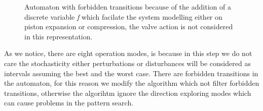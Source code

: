       \begin{figure}[!hbt]
        \centering
        
        \captionsetup{format=hang}
        \caption{Automaton with forbidden transitions because of the addition of a 
        discrete variable \emph{f} which facilate the system modelling either on
        piston expansion or compression, the valve action is not considered
        in this representation.}
        \label{fig:automaton}
      \end{figure}
      As we notice, there are eight operation modes, is because in this step
      we do not care the stochasticity  either perturbations or disturbances 
      will be considered as intervals assuming the best and the worst case.
      There are forbidden transitions in the automaton, for this reason we 
      modify the algorithm which not filter forbidden transitions, otherwise
      the algorihtm ignore the direction exploring modes which can cause problems
      in the pattern search.
      \clearpage 
      \
      \
